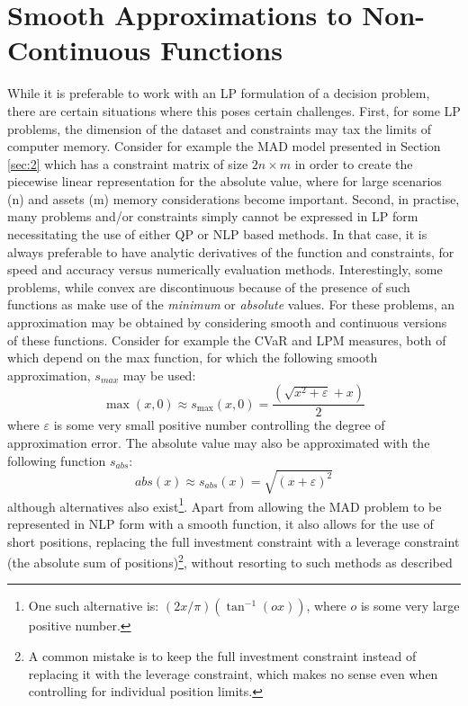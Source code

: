 \section{Smooth Approximations to Non-Continuous Functions}\label{sec:5}
While it is preferable to work with an LP formulation of a decision problem,
there are certain situations where this poses certain challenges. First, for
some LP problems, the dimension of the dataset and constraints may tax the
limits of computer memory. Consider for example the MAD model presented in
Section \ref{sec:2} which has a constraint matrix of size $2n \times m$ in
order to create the piecewise linear representation for the absolute value,
where for large scenarios (n) and assets (m) memory considerations become
important. Second, in practise, many problems and/or constraints simply
cannot be expressed in LP form necessitating the use of either QP or NLP
based methods. In that case, it is always preferable to have analytic
derivatives of the function and constraints, for speed and accuracy versus
numerically evaluation methods. Interestingly, some problems, while convex
are discontinuous because of the presence of such functions as make use of
the \emph{minimum} or \emph{absolute} values. For these problems, an
approximation may be obtained by considering smooth and continuous versions
of these functions. Consider for example the CVaR and LPM measures, both of
which depend on the max function, for which the following smooth
approximation, $s_{max}$ may be used:
\begin{equation}\label{eq:smax}
\max \left( {x,0} \right) \approx {s_{\max }}\left( {x,0} \right)=\frac{{\left( {\sqrt {{x^2} + \varepsilon }  + x} \right)}}{2}
\end{equation}
where $\varepsilon$ is some very small positive number controlling the degree of approximation error. The absolute value may also be approximated
with the following function $s_{abs}$:
\begin{equation}\label{eq:sabs}
{abs} \left( {x} \right) \approx {s_{abs }}\left( {x} \right)=\sqrt {{{\left( {x + \varepsilon } \right)}^2}}
\end{equation}
although alternatives also exist\footnote{One such alternative is:  $\left(
{2x/\pi } \right)\left( {{{\tan }^{ - 1}}\left( {ox} \right)} \right)$, where
$o$ is some very large positive number.}. Apart from allowing the MAD problem
to be represented in NLP form with a smooth function, it also allows for the
use of short positions, replacing the full investment constraint with a
leverage constraint (the absolute sum of positions)\footnote{A common mistake
is to keep the full investment constraint instead of replacing it with the
leverage constraint, which makes no sense even when controlling for
individual position limits.}, without resorting to such methods as described

